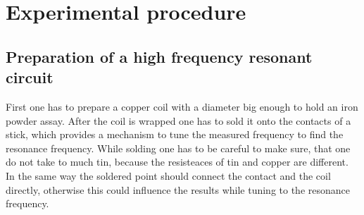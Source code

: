 \section{Experimental procedure}
	\subsection{Preparation of a high frequency resonant circuit}
    First one has to prepare a copper coil with a diameter big enough to hold an iron powder assay. After the coil is wrapped one has to sold it onto the contacts of a stick, which provides a mechanism to tune the measured frequency to find the resonance frequency. While solding one has to be careful to make sure, that one do not take to much tin, because the resisteaces of tin and copper are different. In the same way the soldered point should connect the contact and the coil directly, otherwise this could influence the results while tuning to the resonance frequency.
    \subsection{}
    
    \subsection{}